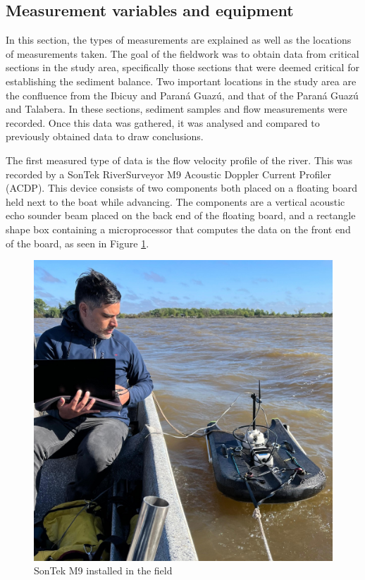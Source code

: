 
\subsection{Measurement variables and equipment}
\label{Measurement variables and equipment}
In this section, the types of measurements are explained as well as the locations of measurements taken. The goal of the fieldwork was to obtain data from critical sections in the study area, specifically those sections that were deemed critical for establishing the sediment balance. Two important locations in the study area are the confluence from the Ibicuy and Paraná Guazú, and that of the Paraná Guazú and Talabera. In these sections, sediment samples and flow measurements were recorded. Once this data was gathered, it was analysed and compared to previously obtained data to draw conclusions. 



The first measured type of data is the flow velocity profile of the river. This was recorded by a SonTek RiverSurveyor M9 Acoustic Doppler Current Profiler (ACDP). This device consists of two components both placed on a floating board held next to the boat while advancing. The components are a vertical acoustic echo sounder beam placed on the back end of the floating board, and a rectangle shape box containing a microprocessor that computes the data on the front end of the board, as seen in Figure \ref{fig:SonTekmeasurement}.

\begin{figure}[H]
    \centering
    \includegraphics[width=0.5\linewidth]{figures/ch4/sonteknico.jpg}
    \caption{SonTek M9 installed in the field}
    \label{fig:SonTekmeasurement}
\end{figure}

